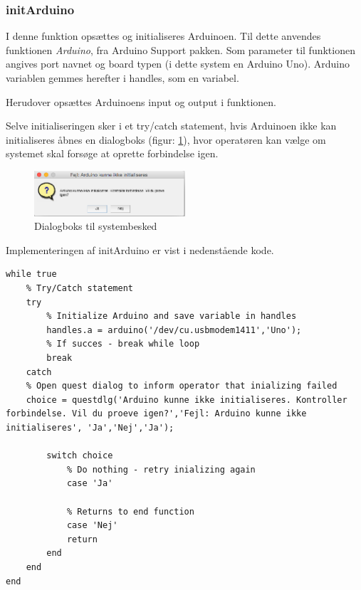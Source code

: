 \subsubsection{initArduino}
I denne funktion opsættes og initialiseres Arduinoen. Til dette anvendes funktionen \textit{Arduino}, fra Arduino Support pakken. Som parameter til funktionen angives port navnet og board typen (i dette system en Arduino Uno). Arduino variablen gemmes herefter i handles, som en variabel.

Herudover opsættes Arduinoens input og output i funktionen. 

Selve initialiseringen sker i et try/catch statement, hvis Arduinoen ikke kan initialiseres åbnes en dialogboks (figur: \ref{fig:initArduino}), hvor operatøren kan vælge om systemet skal forsøge at oprette forbindelse igen. 

\begin{figure}[H]
	\centering
	\includegraphics[width=0.5\textwidth]{billeder/software/initArduino.png}
	\caption{Dialogboks til systembesked}
	\label{fig:initArduino}
\end{figure}

Implementeringen af initArduino er vist i nedenstående kode.
\begin{lstlisting} 
while true
    % Try/Catch statement
    try
        % Initialize Arduino and save variable in handles
        handles.a = arduino('/dev/cu.usbmodem1411','Uno');
        % If succes - break while loop
        break
    catch
    % Open quest dialog to inform operator that inializing failed    
    choice = questdlg('Arduino kunne ikke initialiseres. Kontroller forbindelse. Vil du proeve igen?','Fejl: Arduino kunne ikke initialiseres', 'Ja','Nej','Ja');

        switch choice
            % Do nothing - retry inializing again
            case 'Ja'
        
            % Returns to end function
            case 'Nej'
            return
        end
    end
end
\end{lstlisting} 
